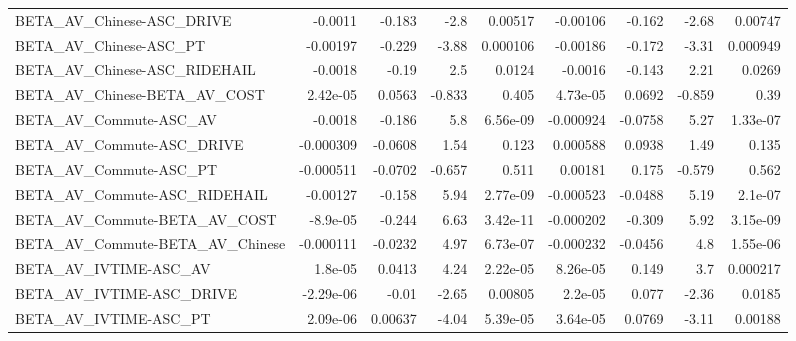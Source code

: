 \begin{tabular}{lrrrrrrrr}
BETA\_AV\_Chinese-ASC\_DRIVE                          &     -0.0011 &       -0.183 &     -2.8 &  0.00517 &   -0.00106 &      -0.162 &        -2.68 &       0.00747 \\
BETA\_AV\_Chinese-ASC\_PT                             &    -0.00197 &       -0.229 &    -3.88 & 0.000106 &   -0.00186 &      -0.172 &        -3.31 &      0.000949 \\
BETA\_AV\_Chinese-ASC\_RIDEHAIL                       &     -0.0018 &        -0.19 &      2.5 &   0.0124 &    -0.0016 &      -0.143 &         2.21 &        0.0269 \\
BETA\_AV\_Chinese-BETA\_AV\_COST                       &    2.42e-05 &       0.0563 &   -0.833 &    0.405 &   4.73e-05 &      0.0692 &       -0.859 &          0.39 \\
BETA\_AV\_Commute-ASC\_AV                             &     -0.0018 &       -0.186 &      5.8 & 6.56e-09 &  -0.000924 &     -0.0758 &         5.27 &      1.33e-07 \\
BETA\_AV\_Commute-ASC\_DRIVE                          &   -0.000309 &      -0.0608 &     1.54 &    0.123 &   0.000588 &      0.0938 &         1.49 &         0.135 \\
BETA\_AV\_Commute-ASC\_PT                             &   -0.000511 &      -0.0702 &   -0.657 &    0.511 &    0.00181 &       0.175 &       -0.579 &         0.562 \\
BETA\_AV\_Commute-ASC\_RIDEHAIL                       &    -0.00127 &       -0.158 &     5.94 & 2.77e-09 &  -0.000523 &     -0.0488 &         5.19 &       2.1e-07 \\
BETA\_AV\_Commute-BETA\_AV\_COST                       &    -8.9e-05 &       -0.244 &     6.63 & 3.42e-11 &  -0.000202 &      -0.309 &         5.92 &      3.15e-09 \\
BETA\_AV\_Commute-BETA\_AV\_Chinese                    &   -0.000111 &      -0.0232 &     4.97 & 6.73e-07 &  -0.000232 &     -0.0456 &          4.8 &      1.55e-06 \\
BETA\_AV\_IVTIME-ASC\_AV                              &     1.8e-05 &       0.0413 &     4.24 & 2.22e-05 &   8.26e-05 &       0.149 &          3.7 &      0.000217 \\
BETA\_AV\_IVTIME-ASC\_DRIVE                           &   -2.29e-06 &        -0.01 &    -2.65 &  0.00805 &    2.2e-05 &       0.077 &        -2.36 &        0.0185 \\
BETA\_AV\_IVTIME-ASC\_PT                              &    2.09e-06 &      0.00637 &    -4.04 & 5.39e-05 &   3.64e-05 &      0.0769 &        -3.11 &       0.00188 \\

\end{tabular}
